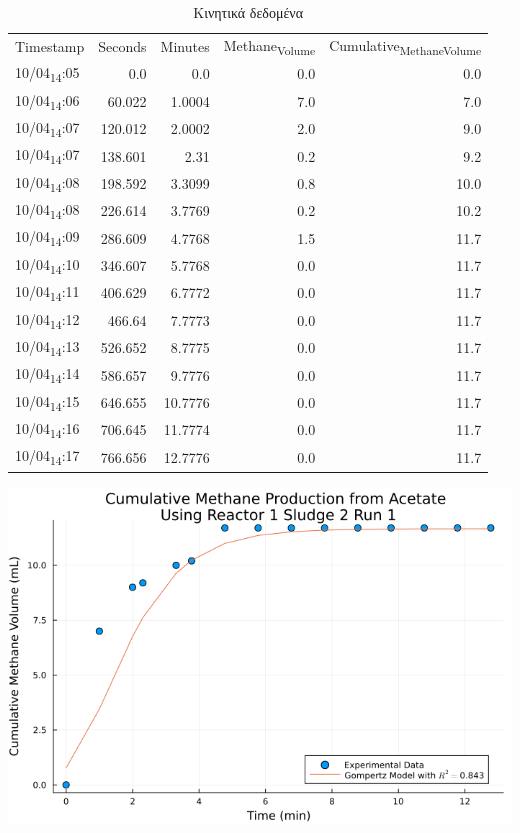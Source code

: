 \documentclass[11pt]{article}
\begin{document}
\begin{table}[htbp]
\caption{Κινητικά δεδομένα}
\centering
\begin{tabular}{lrrrr}
Timestamp & Seconds & Minutes & Methane\textsubscript{Volume} & Cumulative\textsubscript{Methane}\textsubscript{Volume}\\[0pt]
10/04\textsubscript{14}:05 & 0.0 & 0.0 & 0.0 & 0.0\\[0pt]
10/04\textsubscript{14}:06 & 60.022 & 1.0004 & 7.0 & 7.0\\[0pt]
10/04\textsubscript{14}:07 & 120.012 & 2.0002 & 2.0 & 9.0\\[0pt]
10/04\textsubscript{14}:07 & 138.601 & 2.31 & 0.2 & 9.2\\[0pt]
10/04\textsubscript{14}:08 & 198.592 & 3.3099 & 0.8 & 10.0\\[0pt]
10/04\textsubscript{14}:08 & 226.614 & 3.7769 & 0.2 & 10.2\\[0pt]
10/04\textsubscript{14}:09 & 286.609 & 4.7768 & 1.5 & 11.7\\[0pt]
10/04\textsubscript{14}:10 & 346.607 & 5.7768 & 0.0 & 11.7\\[0pt]
10/04\textsubscript{14}:11 & 406.629 & 6.7772 & 0.0 & 11.7\\[0pt]
10/04\textsubscript{14}:12 & 466.64 & 7.7773 & 0.0 & 11.7\\[0pt]
10/04\textsubscript{14}:13 & 526.652 & 8.7775 & 0.0 & 11.7\\[0pt]
10/04\textsubscript{14}:14 & 586.657 & 9.7776 & 0.0 & 11.7\\[0pt]
10/04\textsubscript{14}:15 & 646.655 & 10.7776 & 0.0 & 11.7\\[0pt]
10/04\textsubscript{14}:16 & 706.645 & 11.7774 & 0.0 & 11.7\\[0pt]
10/04\textsubscript{14}:17 & 766.656 & 12.7776 & 0.0 & 11.7\\[0pt]
\end{tabular}
\end{table}

\begin{center}
\includegraphics[width=.9\linewidth]{../plots/BMPs/Acetate/methane_kinetics_acet_test_1_s2_min.png}
\end{center}
\end{document}
